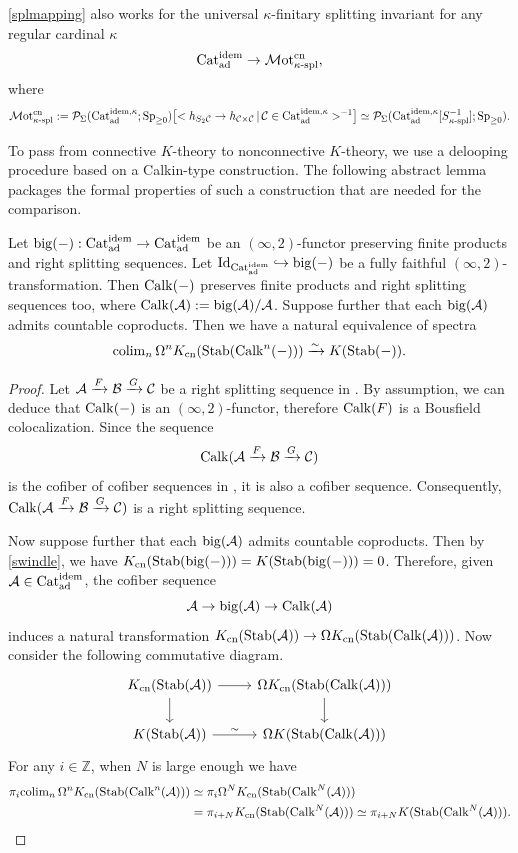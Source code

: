 \documentclass[a4paper,10pt, oneside]{amsart}
\begin{document}
\begin{rem}
	\cref{splmapping} also works for the universal $\kappa$-finitary splitting invariant for any regular cardinal $\kappa$
	$$
	\mathrm{Cat}_{\mathrm{ad}}^{\mathrm{idem}} \to \mathcal{M}\mathrm{ot}^{\mathrm{cn}}_{\kappa\text{-}\mathrm{spl}},
	$$
	where
	$$
	\mathcal{M}\mathrm{ot}^{\mathrm{cn}}_{\kappa\text{-}\mathrm{spl}}
	:= \mathcal{P}_{\Sigma}(\mathrm{Cat}_{\mathrm{ad}}^{\mathrm{idem},\kappa};\operatorname{Sp}_{\geq0})
	\bigl[
	< h_{S_2\mathcal{C}} \to h_{\mathcal{C}\times\mathcal{C}}
	\,\vert\, \mathcal{C}\in \mathrm{Cat}_{\mathrm{ad}}^{\mathrm{idem},\kappa} >
	^{-1}
	\bigr]
	\simeq
	\mathcal{P}_{\Sigma}(\mathrm{Cat}_{\mathrm{ad}}^{\mathrm{idem},\kappa}[S_{\kappa\text{-}\mathrm{spl}}^{-1}];\operatorname{Sp}_{\geq0}).
	$$
	
\end{rem}
To pass from connective $K$-theory to nonconnective $K$-theory, we use a
delooping procedure based on a Calkin-type construction.  The following
abstract lemma packages the formal properties of such a construction that are
needed for the comparison.
\begin{lem}\label{big}
	Let $\mathrm{big}(-):\mathrm{Cat}_{\mathrm{ad}}^{\mathrm{idem}}\to \mathrm{Cat}_{\mathrm{ad}}^{\mathrm{idem}}$ be an $(\infty,2)$-functor preserving finite products and right splitting sequences.  Let $\mathrm{Id}_{\mathrm{Cat}_{\mathrm{ad}}^{\mathrm{idem}}}\hookrightarrow\mathrm{big}(-)$ be a fully faithful $(\infty,2)$-transformation.  Then $\mathrm{Calk}(-)$ preserves finite products and right splitting sequences too, where $\mathrm{Calk}(\mathcal{A}):= \mathrm{big}(\mathcal{A})/\mathcal{A}$.
	Suppose further that each $\mathrm{big}(\mathcal{A})$ admits countable coproducts.
	Then we have a natural equivalence of spectra $$\mathrm{colim}_n\, \Omega^nK_{\mathrm{cn}}(\mathrm{Stab}(\mathrm{Calk}^n(-))) \xrightarrow{\sim}K(\mathrm{Stab}(-)).$$	
\end{lem}
\begin{proof}
	Let $\mathcal{A}\xrightarrow{F}\mathcal{B}\xrightarrow{G}\mathcal{C}$ be a right splitting sequence in \catadidem. By assumption, we can deduce that $\mathrm{Calk}(-)$ is an $(\infty,2)$-functor, therefore $\mathrm{Calk}(F)$ is a Bousfield colocalization. Since the sequence $$\mathrm{Calk}(\mathcal{A}\xrightarrow{F}\mathcal{B}\xrightarrow{G}\mathcal{C})$$ is the cofiber of cofiber sequences in \catadidem, it is also a cofiber sequence. Consequently, $\mathrm{Calk}(\mathcal{A}\xrightarrow{F}\mathcal{B}\xrightarrow{G}\mathcal{C})$ is a right splitting sequence.
	
	Now suppose further that each $\mathrm{big}(\mathcal{A})$ admits countable coproducts. Then by \cref{swindle}, we have $K_{\mathrm{cn}}(\mathrm{Stab}(\mathrm{big}(-)))=K(\mathrm{Stab}(\mathrm{big}(-)))=0$. Therefore, given $\mathcal{A}\in\mathrm{Cat}_{\mathrm{ad}}^{\mathrm{idem}}$, the cofiber sequence 
	$$\mathcal{A}\to\mathrm{big}(\mathcal{A})\to \mathrm{Calk}(\mathcal{A})$$
	induces a natural transformation $K_{\mathrm{cn}}(\mathrm{Stab}(\mathcal{A}))\to \Omega K_{\mathrm{cn}}(\mathrm{Stab}(\mathrm{Calk}(\mathcal{A})))$. Now consider the following commutative diagram.
	$$\begin{tikzcd}
		\kcn(\stab(\mca)) \arrow[r] \arrow[d] & \Omega\kcn(\stab(\calk(\mca))) \arrow[d] \\
		K(\stab(\mca)) \arrow[r, "\sim"]      & \Omega K(\stab(\calk(\mca)))            
	\end{tikzcd}$$
	For any $i\in\mathbb{Z}$, when $N$ is large enough we have $$\begin{aligned}
		\pi_i \mathrm{colim}_n\, \Omega^n K_{\mathrm{cn}}(\mathrm{Stab}(\mathrm{Calk}^n(\mathcal{A})))
		&\simeq \pi_i \Omega^N K_{\mathrm{cn}}(\mathrm{Stab}(\mathrm{Calk}^N(\mathcal{A}))) \\
		&= \pi_{i+N}K_{\mathrm{cn}}(\mathrm{Stab}(\mathrm{Calk}^N(\mathcal{A})))
		\simeq \pi_{i+N}K(\mathrm{Stab}(\mathrm{Calk}^N(\mathcal{A}))).
	\end{aligned}$$
\end{proof}
\end{document}
